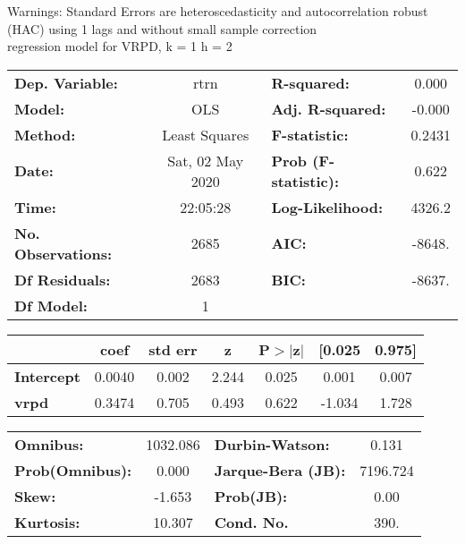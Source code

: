 Warnings: \newline
 [1] Standard Errors are heteroscedasticity and autocorrelation robust (HAC) using 1 lags and without small sample correction\\ 

regression model for VRPD, k = 1 h = 2\begin{center}
\begin{tabular}{lclc}
\toprule
\textbf{Dep. Variable:}    &       rtrn       & \textbf{  R-squared:         } &     0.000   \\
\textbf{Model:}            &       OLS        & \textbf{  Adj. R-squared:    } &    -0.000   \\
\textbf{Method:}           &  Least Squares   & \textbf{  F-statistic:       } &    0.2431   \\
\textbf{Date:}             & Sat, 02 May 2020 & \textbf{  Prob (F-statistic):} &    0.622    \\
\textbf{Time:}             &     22:05:28     & \textbf{  Log-Likelihood:    } &    4326.2   \\
\textbf{No. Observations:} &        2685      & \textbf{  AIC:               } &    -8648.   \\
\textbf{Df Residuals:}     &        2683      & \textbf{  BIC:               } &    -8637.   \\
\textbf{Df Model:}         &           1      & \textbf{                     } &             \\
\bottomrule
\end{tabular}
\begin{tabular}{lcccccc}
                   & \textbf{coef} & \textbf{std err} & \textbf{z} & \textbf{P$> |$z$|$} & \textbf{[0.025} & \textbf{0.975]}  \\
\midrule
\textbf{Intercept} &       0.0040  &        0.002     &     2.244  &         0.025        &        0.001    &        0.007     \\
\textbf{vrpd}      &       0.3474  &        0.705     &     0.493  &         0.622        &       -1.034    &        1.728     \\
\bottomrule
\end{tabular}
\begin{tabular}{lclc}
\textbf{Omnibus:}       & 1032.086 & \textbf{  Durbin-Watson:     } &    0.131  \\
\textbf{Prob(Omnibus):} &   0.000  & \textbf{  Jarque-Bera (JB):  } & 7196.724  \\
\textbf{Skew:}          &  -1.653  & \textbf{  Prob(JB):          } &     0.00  \\
\textbf{Kurtosis:}      &  10.307  & \textbf{  Cond. No.          } &     390.  \\
\bottomrule
\end{tabular}
\end{center}

